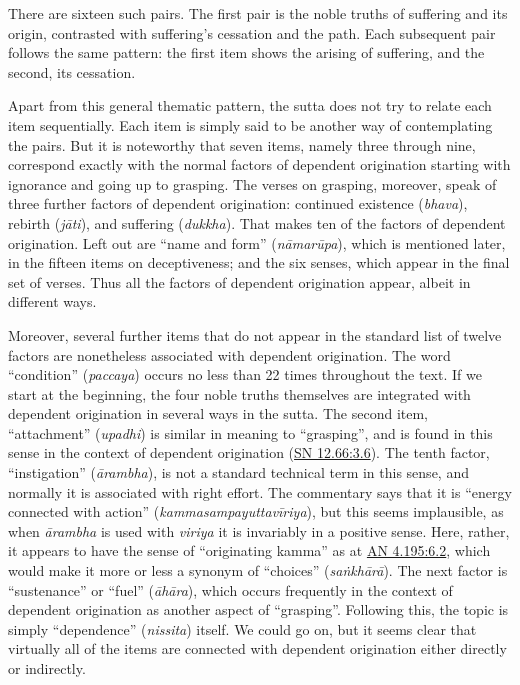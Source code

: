 \documentclass[12pt,openany]{book}%
\begin{document}
There are sixteen such pairs. The first pair is the noble truths of suffering and its origin, contrasted with suffering’s cessation and the path. Each subsequent pair follows the same pattern: the first item shows the arising of suffering, and the second, its cessation.

Apart from this general thematic pattern, the sutta does not try to relate each item sequentially. Each item is simply said to be another way of contemplating the pairs. But it is noteworthy that seven items, namely three through nine, correspond exactly with the normal factors of dependent origination starting with ignorance and going up to grasping. The verses on grasping, moreover, speak of three further factors of dependent origination: continued existence (\textit{bhava}), rebirth (\textit{\textsanskrit{jāti}}), and suffering (\textit{dukkha}). That makes ten of the factors of dependent origination. Left out are “name and form” (\textit{\textsanskrit{nāmarūpa}}), which is mentioned later, in the fifteen items on deceptiveness; and the six senses, which appear in the final set of verses. Thus all the factors of dependent origination appear, albeit in different ways.

Moreover, several further items that do not appear in the standard list of twelve factors are nonetheless associated with dependent origination. The word “condition” (\textit{paccaya}) occurs no less than 22 times throughout the text. If we start at the beginning, the four noble truths themselves are integrated with dependent origination in several ways in the sutta. The second item, “attachment” (\textit{upadhi}) is similar in meaning to “grasping”, and is found in this sense in the context of dependent origination (\href{https://suttacentral.net/sn12.66/en/sujato\#3.6}{SN 12.66:3.6}). The tenth factor, “instigation” (\textit{\textsanskrit{ārambha}}), is not a standard technical term in this sense, and normally it is associated with right effort. The commentary says that it is “energy connected with action” (\textit{\textsanskrit{kammasampayuttavīriya}}), but this seems implausible, as when \textit{\textsanskrit{ārambha}} is used with \textit{viriya} it is invariably in a positive sense. Here, rather, it appears to have the sense of “originating kamma” as at \href{https://suttacentral.net/an4.195/en/sujato\#6.2}{AN 4.195:6.2}, which would make it more or less a synonym of “choices” (\textit{\textsanskrit{saṅkhārā}}). The next factor is “sustenance” or “fuel” (\textit{\textsanskrit{āhāra}}), which occurs frequently in the context of dependent origination as another aspect of “grasping”. Following this, the topic is simply “dependence” (\textit{nissita}) itself. We could go on, but it seems clear that virtually all of the items are connected with dependent origination either directly or indirectly.
\end{document}
